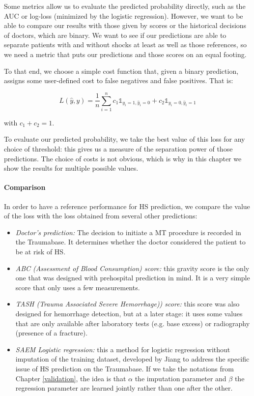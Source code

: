 Some metrics allow us to evaluate the predicted probability directly, such as the AUC \cite{huang2005AUC} or log-loss (minimized by the logistic regression). However, we want to be able to compare our results with those given by scores or the historical decisions of doctors, which are binary. We want to see if our predictions are able to separate patients with and without shocks at least as well as those references, so we need a metric that puts our predictions and those scores on an equal footing.

To that end, we choose a simple cost function that, given a binary prediction, assigns some user-defined cost to false negatives and false positives. That is:

$$ L(\hat{y}, y)=\frac{1}{n} \sum \limits_{i=1}^n c_1 \mathbb{1}_{y_i=1,\hat{y}_i=0} + c_2 \mathbb{1}_{y_i=0,\hat{y}_i=1}$$

with $c_1 + c_2 = 1$.

To evaluate our predicted probability, we take the best value of this loss for any choice of threshold: this gives us a measure of the separation power of those predictions. The choice of costs is not obvious, which is why in this chapter we show the results for multiple possible values.

\paragraph{Comparison}
In order to have a reference performance for HS prediction, we compare the value of the loss with the loss obtained from several other predictions:
\begin{itemize}
\item \emph{Doctor's prediction:} The decision to initiate a MT procedure is recorded in the Traumabase. It determines whether the doctor considered the patient to be at risk of HS.
\item \emph{ABC (Assessment of Blood Consumption)\cite{nunez2009ABC} score:} this gravity score is the only one that was designed with prehospital prediction in mind. It is a very simple score that only uses a few measurements.
\item \emph{TASH (Trauma Associated Severe Hemorrhage)\cite{yucel2006tash}) score:} this score was also designed for hemorrhage detection, but at a later stage: it uses some values that are only available after laboratory tests (e.g. base excess) or radiography (presence of a fracture).
\item \emph{SAEM Logistic regression:} this a method for logistic regression without imputation of the training dataset, developed by Jiang \cite{jiangsaem} to address the specific issue of HS prediction on the Traumabase. If we take the notations from Chapter \ref{validation}, the idea is that $\alpha$ the imputation parameter and $\beta$ the regression parameter are learned jointly rather than one after the other. 
\end{itemize}

